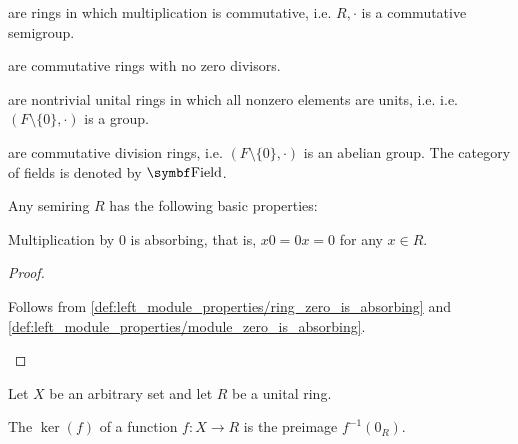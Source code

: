 \begin{definition}
\begin{defenum}
      are rings in which multiplication is commutative, i.e. \( R, \cdot \) is a commutative semigroup.

      are commutative rings with no zero divisors.

      are nontrivial unital rings in which all nonzero elements are units, i.e. i.e. \( (F \setminus \{ 0 \}, \cdot) \) is a group.

      are commutative division rings, i.e. \( (F \setminus \{ 0 \}, \cdot) \) is an abelian group. The category of fields is denoted by \( \Cat{Field} \).
  \end{defenum}
\end{definition}

\begin{proposition}\label{def:semiring_properties}
  Any semiring \( R \) has the following basic properties:
  \begin{defenum}
     Multiplication by \( 0 \) is absorbing, that is, \( x0 = 0x = 0 \) for any \( x \in R \).
  \end{defenum}
\end{proposition}
\begin{proof}\mbox{}
  \begin{itemize}
     Follows from \cref{def:left_module_properties/ring_zero_is_absorbing} and \cref{def:left_module_properties/module_zero_is_absorbing}.
  \end{itemize}
\end{proof}

\begin{definition}\label{def:semiring_kernel}
  Let \( X \) be an arbitrary set and let \( R \) be a unital ring.

  The  \( \ker(f) \) of a function \( f: X \to R \) is the preimage \( f^{-1}(0_R) \).
\end{definition}

